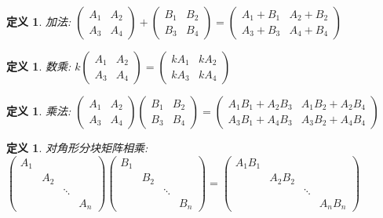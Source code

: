 \documentclass[12pt, a4paper, oneside]{ctexbook}
\newtheorem{definition}[theorem]{定义}
\begin{document}
\begin{definition}
    加法: $\begin{pmatrix}
        A_1 & A_2 \\
        A_3 & A_4
    \end{pmatrix} + \begin{pmatrix}
        B_1 & B_2 \\
        B_3 & B_4
    \end{pmatrix} = \begin{pmatrix}
        A_1+B_1 & A_2+B_2 \\
        A_3+B_3 & A_4+B_4
    \end{pmatrix}$
\end{definition}

\begin{definition}
    数乘: $k \begin{pmatrix}
        A_1 & A_2 \\
        A_3 & A_4
    \end{pmatrix} = \begin{pmatrix}
        kA_1 & kA_2 \\
        kA_3 & kA_4
    \end{pmatrix}$
\end{definition}

\begin{definition}
    乘法: $\begin{pmatrix}
        A_1 & A_2 \\
        A_3 & A_4
    \end{pmatrix} \begin{pmatrix}
        B_1 & B_2 \\
        B_3 & B_4
    \end{pmatrix} = \begin{pmatrix}
        A_1B_1 + A_2B_3 & A_1B_2 + A_2B_4 \\
        A_3B_1 + A_4B_3 & A_3B_2 + A_4B_4
    \end{pmatrix}$
\end{definition}

\begin{definition}
    对角形分块矩阵相乘: $\begin{pmatrix}
        A_1 &     &     & \\
            & A_2 &     & \\
            &     & \ddots & \\
            &     &     & A_n
    \end{pmatrix} \begin{pmatrix}
        B_1 &     &     & \\
            & B_2 &     & \\
            &     & \ddots & \\
            &     &     & B_n
    \end{pmatrix} = \begin{pmatrix}
        A_1B_1 &     &     & \\
            & A_2B_2 &     & \\
            &     & \ddots & \\
            &     &        & A_nB_n
    \end{pmatrix}$
\end{definition}
\end{document}
